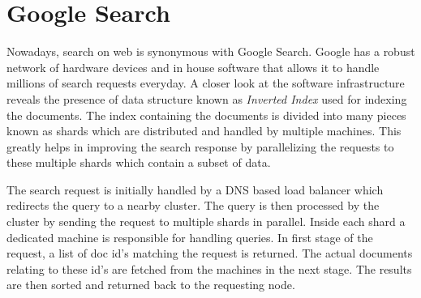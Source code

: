 \documentclass[a4paper,11pt]{kth-mag}
\begin{document}
\section{Google Search}
Nowadays, search on web is synonymous with Google Search. Google has a robust network of hardware devices and in house software that allows it to handle millions of search requests everyday. A closer look at the software infrastructure \cite{googleArchitecture} reveals the presence of data structure known as \textit{Inverted Index} used for indexing the documents. The index containing the documents is divided into many pieces known as shards which are distributed and handled by multiple machines. This greatly helps in improving the search response by parallelizing the requests to these multiple shards which contain a subset of data.
\par The search request is initially handled by a DNS based load balancer which redirects the query to a nearby cluster. The query is then processed by the cluster by sending the request to multiple shards in parallel. Inside each shard a dedicated machine is responsible for handling queries. In first stage of the request, a list of doc id's matching the request is returned. The actual documents relating to these id's are fetched from the machines in the next stage. The results are then sorted and returned back to the requesting node.
\end{document}
